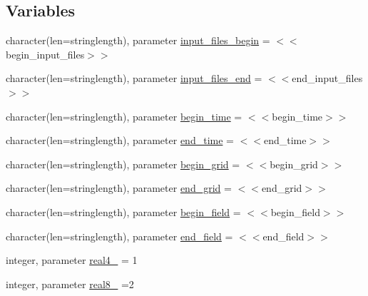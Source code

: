 \subsection*{Variables}
\begin{DoxyCompactItemize}
\item 
character(len=stringlength), parameter \mbox{\hyperlink{namespacemodulenetcdfcf__2__hdf5mohid_af2722b62dfba20d4b796f0f27d82fd31}{input\+\_\+files\+\_\+begin}} = \textquotesingle{}$<$$<$begin\+\_\+input\+\_\+files$>$$>$\textquotesingle{}
\item 
character(len=stringlength), parameter \mbox{\hyperlink{namespacemodulenetcdfcf__2__hdf5mohid_a5dcc549a17ea43615db8980b538175aa}{input\+\_\+files\+\_\+end}} = \textquotesingle{}$<$$<$end\+\_\+input\+\_\+files$>$$>$\textquotesingle{}
\item 
character(len=stringlength), parameter \mbox{\hyperlink{namespacemodulenetcdfcf__2__hdf5mohid_a3ee1f28e49bbf7583bea10e71cd5a00f}{begin\+\_\+time}} = \textquotesingle{}$<$$<$begin\+\_\+time$>$$>$\textquotesingle{}
\item 
character(len=stringlength), parameter \mbox{\hyperlink{namespacemodulenetcdfcf__2__hdf5mohid_a55cdff7cefd036166241d8c51ed98a44}{end\+\_\+time}} = \textquotesingle{}$<$$<$end\+\_\+time$>$$>$\textquotesingle{}
\item 
character(len=stringlength), parameter \mbox{\hyperlink{namespacemodulenetcdfcf__2__hdf5mohid_aa0402f413b24d352700b89425a9e8fc9}{begin\+\_\+grid}} = \textquotesingle{}$<$$<$begin\+\_\+grid$>$$>$\textquotesingle{}
\item 
character(len=stringlength), parameter \mbox{\hyperlink{namespacemodulenetcdfcf__2__hdf5mohid_a7cac99729ac9050630f294b103bd8802}{end\+\_\+grid}} = \textquotesingle{}$<$$<$end\+\_\+grid$>$$>$\textquotesingle{}
\item 
character(len=stringlength), parameter \mbox{\hyperlink{namespacemodulenetcdfcf__2__hdf5mohid_aac283ad6dfec7b5769037bc1906cf217}{begin\+\_\+field}} = \textquotesingle{}$<$$<$begin\+\_\+field$>$$>$\textquotesingle{}
\item 
character(len=stringlength), parameter \mbox{\hyperlink{namespacemodulenetcdfcf__2__hdf5mohid_ac1d1a6545e333d0284482ad0b31b7d7c}{end\+\_\+field}} = \textquotesingle{}$<$$<$end\+\_\+field$>$$>$\textquotesingle{}
\item 
integer, parameter \mbox{\hyperlink{namespacemodulenetcdfcf__2__hdf5mohid_a1839df8ab39bee44f30beaf7101ddcfc}{real4\+\_\+}} = 1
\item 
integer, parameter \mbox{\hyperlink{namespacemodulenetcdfcf__2__hdf5mohid_ad75185339675809679215a369cbf65fa}{real8\+\_\+}} =2

\end{DoxyCompactItemize}
